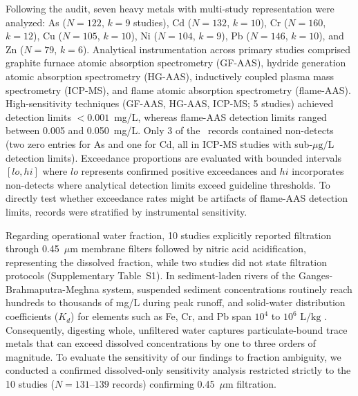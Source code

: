 \documentclass[authoryear,preprint,12pt]{elsarticle}
\begin{document}
Following the audit, seven heavy metals with multi-study representation were analyzed: As ($N=122$, $k=9$ studies), Cd ($N=132$, $k=10$), Cr ($N=160$, $k=12$), Cu ($N=105$, $k=10$), Ni ($N=104$, $k=9$), Pb ($N=146$, $k=10$), and Zn ($N=79$, $k=6$). Analytical instrumentation across primary studies comprised graphite furnace atomic absorption spectrometry (GF-AAS), hydride generation atomic absorption spectrometry (HG-AAS), inductively coupled plasma mass spectrometry (ICP-MS), and flame atomic absorption spectrometry (flame-AAS). High-sensitivity techniques (GF-AAS, HG-AAS, ICP-MS; 5 studies) achieved detection limits $<0.001$~mg/L, whereas flame-AAS detection limits ranged between 0.005 and 0.050~mg/L. Only 3 of the \TotalMetalRecords\ records contained non-detects (two zero entries for As and one for Cd, all in ICP-MS studies with sub-$\mu\text{g/L}$ detection limits). Exceedance proportions are evaluated with bounded intervals $[lo, hi]$ where $lo$ represents confirmed positive exceedances and $hi$ incorporates non-detects where analytical detection limits exceed guideline thresholds. To directly test whether exceedance rates might be artifacts of flame-AAS detection limits, records were stratified by instrumental sensitivity.

Regarding operational water fraction, 10 studies explicitly reported filtration through 0.45~$\mu\text{m}$ membrane filters followed by nitric acid acidification, representing the dissolved fraction, while two studies did not state filtration protocols (Supplementary Table~S1). In sediment-laden rivers of the Ganges-Brahmaputra-Meghna system, suspended sediment concentrations routinely reach hundreds to thousands of mg/L during peak runoff, and solid-water distribution coefficients ($K_d$) for elements such as Fe, Cr, and Pb span $10^4$ to $10^6\text{ L/kg}$ \citep{Gaillardet2014}. Consequently, digesting whole, unfiltered water captures particulate-bound trace metals that can exceed dissolved concentrations by one to three orders of magnitude. To evaluate the sensitivity of our findings to fraction ambiguity, we conducted a confirmed dissolved-only sensitivity analysis restricted strictly to the 10 studies ($N=131$--$139$ records) confirming 0.45~$\mu\text{m}$ filtration.
\end{document}
